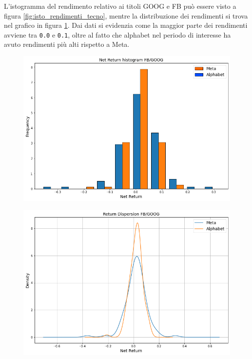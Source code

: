\documentclass{article}
\begin{document}
L'istogramma del rendimento relativo ai titoli GOOG e FB può essere visto a figura \ref{fig:isto_rendimenti_tecno}, mentre la distribuzione dei 
rendimenti si trova nel grafico in figura \ref{fig:dispersione_tecno}.
Dai dati si evidenzia come la maggior parte dei rendimenti avviene tra \verb|0.0| e \verb|0.1|, oltre al fatto che alphabet nel periodo di interesse ha avuto rendimenti più alti
rispetto a Meta.

\begin{figure}[h]
  \centering
  \begin{minipage}{.5\textwidth}
    \centering
    \includegraphics[width=1\linewidth]{net_ret_tecno_hist.png}
    \label{fig:isto_rendimenti_tecno}
  \end{minipage}%
  \begin{minipage}{.5\textwidth}
    \centering
    \includegraphics[width=1\linewidth]{dispersione_tecno.png}
    \label{fig:dispersione_tecno}
  \end{minipage}
\end{figure}
\end{document}

